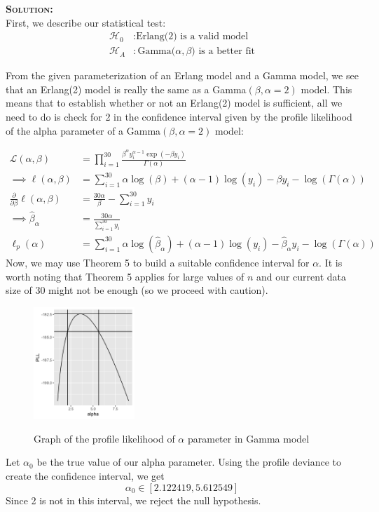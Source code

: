 \documentclass[12pt,oneside]{article}
\newenvironment{solution}
    {\textbf{\textsc{Solution:}}\\}
    {\newpage}
\def\l{\ell}
\def\pt{\partial}
\begin{document}
\begin{solution}
First, we describe our statistical test:
\begin{align*}
    \mathcal{H}_0&: \text{Erlang(2) is a valid model}\\
    \mathcal{H}_A&: \text{Gamma($\alpha,\beta$) is a better fit}
\end{align*}

From the given parameterization of an Erlang model and a Gamma model, we see that an Erlang(2) model is really the same as a Gamma$(\beta,\alpha=2)$ model. This means that to establish whether or not an Erlang(2) model is sufficient, all we need to do is check for 2 in the confidence interval given by the profile likelihood of the alpha parameter of a Gamma$(\beta,\alpha=2)$ model:

\begin{align*}
    \mathcal{L}(\alpha,\beta)&= \prod_{i=1}^{30} \frac{\beta^\alpha y_i^{\alpha -1} \exp(-\beta y_i)}{\Gamma(\alpha)}\\
    \implies \l(\alpha,\beta)&=\sum_{i=1}^{30} \alpha\log(\beta)+(\alpha-1)\log(y_i) -\beta y_i - \log(\Gamma(\alpha))\\
    \frac{\pt}{\pt\beta}\l(\alpha,\beta)&= \frac{30\alpha}{\beta}-\sum_{i=1}^{30}y_i\\
    \implies \hat{\beta}_\alpha&= \frac{30\alpha}{\sum_{i=1}^{30}y_i}\\
    \l_p(\alpha)&=\sum_{i=1}^{30} \alpha\log(\hat{\beta}_\alpha)+(\alpha-1)\log(y_i) -\hat{\beta}_\alpha y_i - \log(\Gamma(\alpha))
\end{align*}
Now, we may use Theorem 5 to build a suitable confidence interval for $\alpha$. It is worth noting that Theorem 5 applies for large values of $n$ and our current data size of $30$ might not be enough (so we proceed with caution).
\begin{figure}[H]
\begin{center}
{\includegraphics[width=1.5in]{a1/pll-alpha.png}}
\caption{Graph of the profile likelihood of $\alpha$ parameter in Gamma model}
\end{center}
\end{figure}
Let $\alpha_0$ be the true value of our alpha parameter. Using the profile deviance to create the confidence interval, we get \[\alpha_0\in [2.122419,5.612549]\]
Since 2 is not in this interval, we reject the null hypothesis.


\end{solution}
\end{document}
